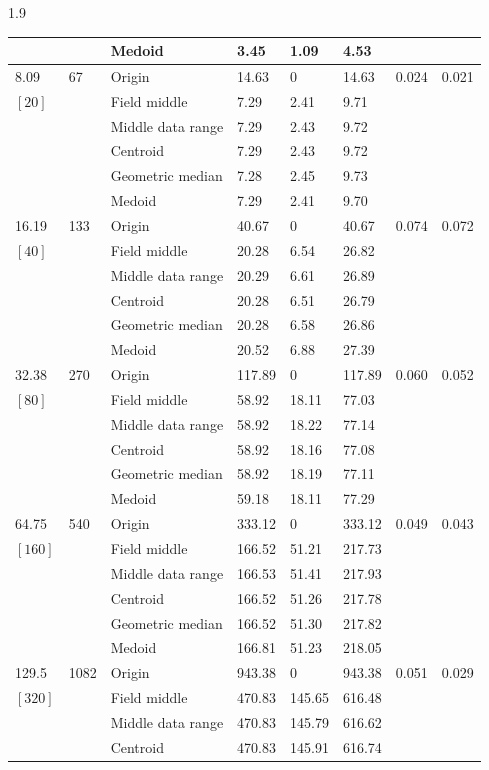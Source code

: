 \documentclass[phd]{ndsu-thesis-2022}
\newcommand\myspacing{1.9} %
\begin{document}
\begin{spacing}{\myspacing}
{{\begin{ThreePartTable}
\begin{longtable}{lll lll ll}
 &  & Medoid  & 3.45 & 1.09 & 4.53 \\
\midrule
8.09 & 67 & Origin  & 14.63 & 0 & 14.63 & 0.024 & 0.021 \\
$[20]$ &  & Field middle  & 7.29 & 2.41 & 9.71 \\
 &  & Middle data range  & 7.29 & 2.43 & 9.72 \\
 &  & Centroid & 7.29 & 2.43 & 9.72 \\
 &  & Geometric median & 7.28 & 2.45 & 9.73 \\
 &  & Medoid  & 7.29 & 2.41 & 9.70 \\ 
\midrule
16.19 & 133 & Origin  & 40.67 & 0 & 40.67 & 0.074 & 0.072 \\
$[40]$ &  & Field middle  & 20.28 & 6.54 & 26.82 \\
 &  & Middle data range  & 20.29 & 6.61 & 26.89 \\
 &  & Centroid & 20.28 & 6.51 & 26.79 \\
 &  & Geometric median & 20.28 & 6.58 & 26.86 \\
 &  & Medoid  & 20.52 & 6.88 & 27.39 \\
\midrule
32.38 & 270 & Origin  & 117.89 & 0 & 117.89 & 0.060 & 0.052 \\
$[80]$ &  & Field middle  & 58.92 & 18.11 & 77.03 \\
 &  & Middle data range  & 58.92 & 18.22 & 77.14 \\
 &  & Centroid & 58.92 & 18.16 & 77.08 \\
 &  & Geometric median & 58.92 & 18.19 & 77.11 \\
 &  & Medoid  & 59.18 & 18.11 & 77.29 \\
\midrule
64.75 & 540 & Origin  & 333.12 & 0 & 333.12 & 0.049 & 0.043 \\
$[160]$ &  & Field middle  & 166.52 & 51.21 & 217.73 \\
 &  & Middle data range  & 166.53 & 51.41 & 217.93 \\
 &  & Centroid & 166.52 & 51.26 & 217.78 \\
 &  & Geometric median & 166.52 & 51.30 & 217.82 \\
 &  & Medoid  & 166.81 & 51.23 & 218.05 \\
\midrule
129.5 & 1082 & Origin  & 943.38 & 0 & 943.38 & 0.051 & 0.029 \\
$[320]$ &  & Field middle  & 470.83 & 145.65 & 616.48 \\
 &  & Middle data range  & 470.83 & 145.79 & 616.62 \\
 &  & Centroid & 470.83 & 145.91 & 616.74 \\

\end{longtable}
\end{ThreePartTable}}}
\end{spacing}
\end{document}

